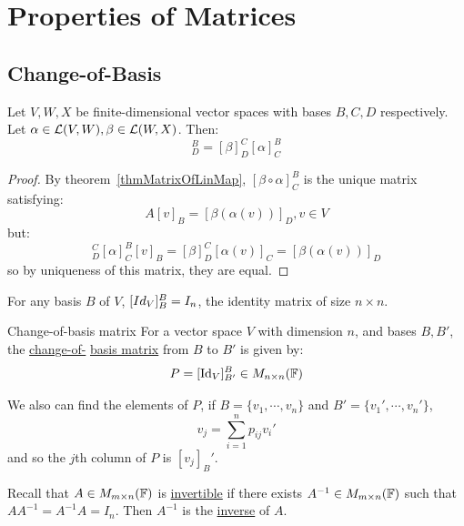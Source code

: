 \documentclass[../Main.tex]{subfiles}
\begin{document}
\section{Properties of Matrices}
\subsection{Change-of-Basis}
\begin{proposition}
    Let $V, W, X$ be finite-dimensional vector spaces with bases $B, C, D$ respectively. Let $\alpha \in \mathcal{L}(V,W), \beta \in \mathcal{L}(W, X)$. Then:
    \begin{equation*}
        [\beta \circ\alpha]_D^B =[\beta]_D^C [\alpha]_C^B
    \end{equation*}
    \label{propMatrixCompose}
\end{proposition}
\begin{proof}
    By theorem~\ref{thmMatrixOfLinMap}, $[\beta\circ\alpha]_C^B$ is the unique matrix satisfying:
    \begin{equation*}
        A[v]_B = [\beta(\alpha(v))]_D, v \in V
    \end{equation*}
    but:
    \begin{equation*}
        [\beta]_D^C[\alpha]_C^B[v]_B = [\beta]_D^C[\alpha(v)]_C = [\beta(\alpha(v))]_D
    \end{equation*}
    so by uniqueness of this matrix, they are equal.
\end{proof}
\begin{remark}
    For any basis $B$ of $V$, $[\\Id_V]_B^B = I_n$, the identity matrix of size $n\times n$.
\end{remark}
\begin{definition}{Change-of-basis matrix}
    For a vector space $V$ with dimension $n$, and bases $B, B'$, the \underline{change-of-} \underline{basis matrix} from $B$ to $B'$ is given by:
    \begin{equation*}
        P = [\operatorname{Id}_V]_{B'}^B \in M_{n \times n}(\mathbb{F})
    \end{equation*}
\end{definition}
We also can find the elements of $P$, if $B = \{v_1, \cdots, v_n\}$ and $B' = \{v_1', \cdots, v_n'\}$,
\begin{equation*}
    v_j = \sum_{i=1}^{n}p_{ij} v_i'
\end{equation*}
and so the $j$th column of $P$ is $[v_j]_B'$.

Recall that $A \in M_{m \times n}(\mathbb{F})$ is \underline{invertible} if there exists $A^{-1} \in M_{m \times n}(\mathbb{F})$ such that $A A^{-1} = A^{-1} A = I_n$. Then $A^{-1}$ is the \underline{inverse} of $A$.
\end{document}
